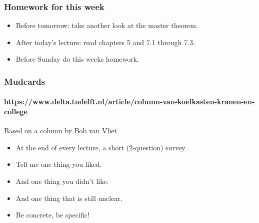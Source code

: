 
\begin{frame}
	\frametitle{Homework for this week}
	\begin{itemize}[<+->]
		\item \alert{Before} tomorrow: take another look at the master theorem.
		\item \alert{After} today's lecture: read chapters 5 and 7.1 through 7.3.
		\item \alert{Before} Sunday do this weeks homework.
	\end{itemize}
	\pause
\end{frame}

\begin{frame}
	\frametitle{Mudcards}
	\framesubtitle{\url{https://www.delta.tudelft.nl/article/column-van-koelkasten-kranen-en-college}}

	\begin{block}{Based on a column by Bob van Vliet}
		\begin{itemize}
			\item At the end of every lecture, a short (2-question) survey.
			\item Tell me one thing you liked.
			\item And one thing you didn't like.
			\item And one thing that is still unclear.
			\item Be concrete, be specific!
		\end{itemize}
	\end{block}
\end{frame}

